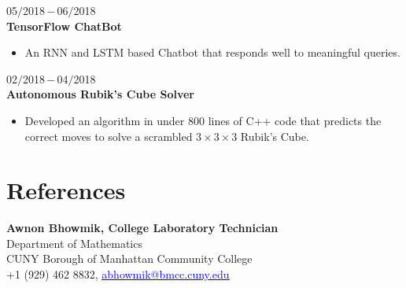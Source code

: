 \documentclass[a4paper, 12pt]{article}
\begin{document}
    \begin{flushleft}
    	05$/$2018\,$-$\,06$/$2018\\
    	\textbf{TensorFlow ChatBot}
    	\begin{itemize}
    		\item An RNN and LSTM based Chatbot that responds well to meaningful queries.
    	\end{itemize}
    \end{flushleft}
    
    \begin{flushleft}
    	02$/$2018\,$-$\,04$/$2018\\
    	\textbf{Autonomous Rubik's Cube Solver}
    	\begin{itemize}
    		\item Developed an algorithm in under $800$ lines of C++ code that predicts the correct moves to solve
a scrambled $3\times3\times3$ Rubik's Cube.
    	\end{itemize}
    \end{flushleft}
    
    \pagebreak
    \section*{References}
    \begin{flushleft}
    \textbf{Awnon Bhowmik, College Laboratory Technician}\\
    Department of Mathematics\\
    CUNY Borough of Manhattan Community College\\
    +1 (929) 462 8832, \href{abhowmik@bmcc.cuny.edu}{\textcolor{blue}{\underline{abhowmik@bmcc.cuny.edu}}}
    \end{flushleft}
\end{document}
